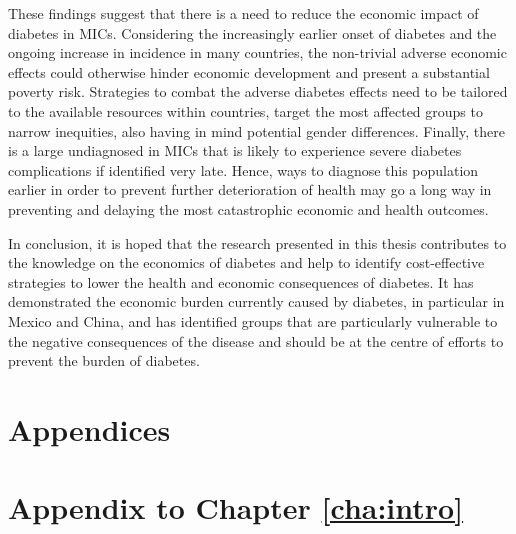 These findings suggest that there is a need to reduce the economic impact of diabetes in \acp{MIC}. Considering the increasingly earlier onset of diabetes and the ongoing increase in incidence in many countries, the non-trivial adverse economic effects could otherwise hinder economic development and present a substantial poverty risk. Strategies to combat the adverse diabetes effects need to be tailored to the available resources within countries, target the most affected groups to narrow inequities, also having in mind potential gender differences. Finally, there is a large undiagnosed \DIFdelbegin {}\DIFdelend \DIFaddbegin {}\DIFaddend in \acp{MIC} that is likely to experience severe diabetes complications if identified very late. Hence, ways to diagnose this population earlier in order to prevent further deterioration of health may go a long way in preventing and delaying the most catastrophic economic and health outcomes.

In conclusion, it is hoped that the research presented in this thesis contributes to the knowledge on the economics of diabetes and help to identify cost-effective strategies to lower the health and economic consequences of diabetes. It has demonstrated the economic burden currently caused by diabetes, in particular in Mexico and China, and has identified groups that are particularly vulnerable to the negative consequences of the disease and should be at the centre of efforts to prevent the burden of diabetes. \newpage 
\printbibliography[heading=bibintoc]
\chapter*{\label{cha:Appendix}Appendices}
\renewcommand{\thechapter}{{\Roman{chapter}}} 
\renewcommand{\thetable}{A\arabic{table}} %
\renewcommand{\thefigure}{A\arabic{figure}} %
\setcounter{chapter}{0}  %
\setcounter{table}{0}
\setcounter{figure}{0}
 \newpage 

\chapter{Appendix to Chapter \ref{cha:intro}}

